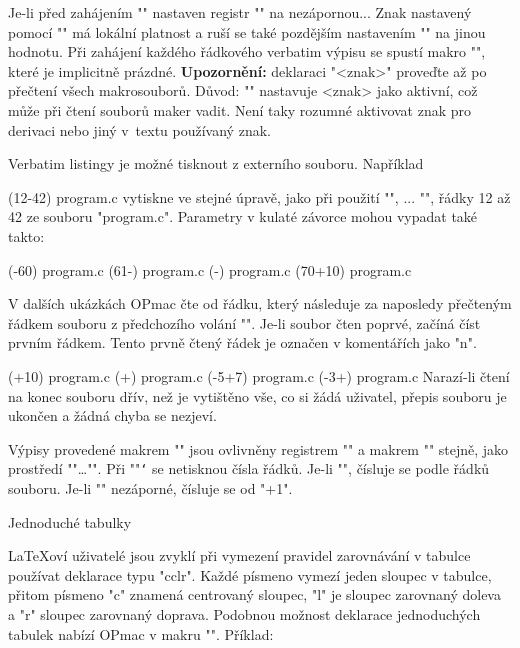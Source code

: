 \begtt
Je-li před zahájením "\begtt" nastaven registr "\ttline" na nezápornou...
\endtt
%
Znak nastavený pomocí "\activettchar" má lokální platnost a ruší se také
pozdějším nastavením "\activettchar" na jinou hodnotu. Při zahájení každého
řádkového verbatim výpisu se spustí makro "\intthook", které je implicitně
prázdné. {\bf Upozornění:} deklaraci "\activettchar<znak>" proveďte až po přečtení všech
makrosouborů. Důvod: "\activettchar" nastavuje <znak> jako aktivní, což může při
čtení souborů maker vadit. Není taky rozumné aktivovat znak pro derivaci nebo jiný
v~textu používaný znak.

Verbatim listingy je možné tisknout z externího souboru. Například

\begtt
\verbinput (12-42) program.c
\endtt
%
vytiskne ve stejné úpravě, jako při použití "\begtt", ... "\endtt", 
řádky 12 až 42 ze souboru "program.c". 
Parametry v kulaté závorce mohou vypadat také takto:

\begtt
\verbinput (-60) program.c   % výpis od začátku souboru do řádku 60
\verbinput (61-) program.c   % výpis od řádku 61 do konce souboru
\verbinput (-) program.c     % výpis celého souboru
\verbinput (70+10) program.c % čtení od řádku 70, přečteno bude 10 řádků
\endtt

V dalších ukázkách OPmac čte od řádku, který následuje za naposledy
přečteným řádkem souboru z předchozího volání "\verbinput". Je-li soubor
čten poprvé, začíná číst prvním řádkem. Tento prvně čtený 
řádek je označen v komentářích jako "n".

\begtt
\verbinput (+10) program.c  % čtení deseti řádků od řádku n
\verbinput (+) program.c    % čtení od řádku n do konce souboru
\vebrinput (-5+7) program.c %
\verbinput (-3+) program.c  % vynechá 3 řádky, tiskne do konce souboru
\endtt
%
Narazí-li čtení na konec souboru dřív, než je vytištěno vše, co si žádá
uživatel, přepis souboru je ukončen a žádná chyba se nezjeví. 

Výpisy provedené makrem "\verbinput" jsou ovlivněny registrem
"\ttindent" a makrem "\tthook" stejně, jako prostředí "\begtt"\dots"\endtt".
Při "\ttline"{\tt\char`} se netisknou čísla řádků. Je-li "", čísluje se podle
řádků souboru. Je-li "\ttline" nezáporné, čísluje se od "\ttline+1".


\sec Jednoduché tabulky

\LaTeX{}oví uživatelé jsou zvyklí při vymezení pravidel zarovnávání v
tabulce používat deklarace typu "{cclr}". Každé písmeno vymezí jeden sloupec
v tabulce, přitom písmeno "c" znamená centrovaný sloupec, "l" je sloupec
zarovnaný doleva a "r" sloupec zarovnaný doprava.
Podobnou možnost deklarace jednoduchých tabulek nabízí
OPmac v makru "". Příklad:

